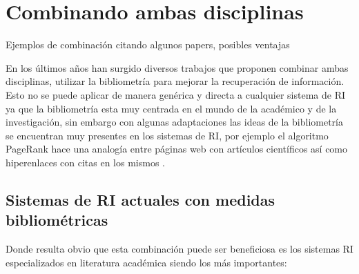 \section{Combinando ambas disciplinas}
Ejemplos de combinación citando algunos papers, posibles ventajas

En los últimos años han surgido diversos trabajos que proponen combinar ambas disciplinas, utilizar la bibliometría para mejorar la recuperación de información. Esto no se puede aplicar de manera genérica y directa a cualquier sistema de \acrshort{RI} ya que la bibliometría esta muy centrada en el mundo de la académico y de la investigación, sin embargo con algunas adaptaciones las ideas de la bibliometría se encuentran muy presentes en los sistemas de \acrshort{RI}, por ejemplo el algoritmo PageRank hace una analogía entre páginas web con artículos científicos así como hiperenlaces con citas en los mismos \cite{PageRankPaper}. 

\subsection{Sistemas de \acrshort{RI} actuales con medidas bibliométricas}
Donde resulta obvio que esta combinación puede ser beneficiosa es los sistemas \acrshort{RI} especializados en literatura académica siendo los más importantes:

